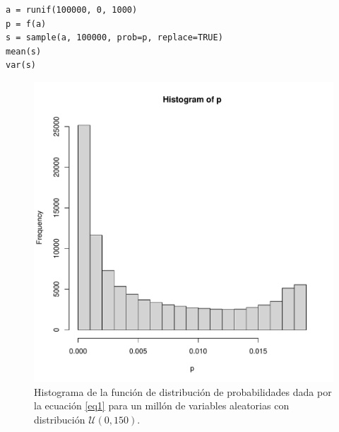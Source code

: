 \documentclass[paper=leter, fontsize=11pt]{scrartcl}
\begin{document}
\begin{lstlisting}[caption={P. 278, 3; aproximación experimental }, captionpos=t, label=278_3_b]
a = runif(100000, 0, 1000)
p = f(a)
s = sample(a, 100000, prob=p, replace=TRUE)
mean(s)
var(s)
\end{lstlisting}

\begin{figure}
    \centering
    \includegraphics[width=1\textwidth]{278_3.pdf}
    \caption{Histograma de la función de distribución de probabilidades dada por la ecuación \ref{eq1} para un millón de variables aleatorias con distribución $\mathcal{U}(0, 150)$.}
    \label{fig:278_3}
\end{figure}
\end{document}
